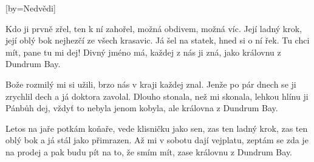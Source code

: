 [by={Nedvědi}]

\beginverse{}
Kdo ji prvně zřel, ten k ní zahořel,
možná obdivem, možná víc. 
Její ladný krok, její oblý bok
nejhezčí ze všech krasavic.
\lrep{} Já šel na statek, hned si o ní řek.
Tu chci mít, pane tu mi dej! 
Divný jméno má, každej z nás ji zná,
jako královnu z Dundrum Bay. \rrep{}
\endverse{}

\beginverse{}
Bože rozmilý mi si užili,
brzo nás v kraji každej znal. 
Jenže po pár dnech se ji zrychlil dech
a já doktora zavolal.
\lrep{} Dlouho stonala, než mi skonala,
lehkou hlínu ji Pánbůh dej, 
vždyť to nebyla jenom kobyla,
ale královna z Dundrum Bay. \rrep{}
\endverse{}

\beginverse{}
Letos na jaře potkám koňaře,
vede klisničku jako sen, 
zas ten ladný krok, zas ten oblý bok
a já stál jako přimrazen.
\lrep{} Až mi v sobotu dají vejplatu,
zeptám se zda je na prodej 
a pak budu pít na to, že smím mít,
zase královnu z Dundrum Bay. \rrep{}
\endverse{}

\endsong{}
